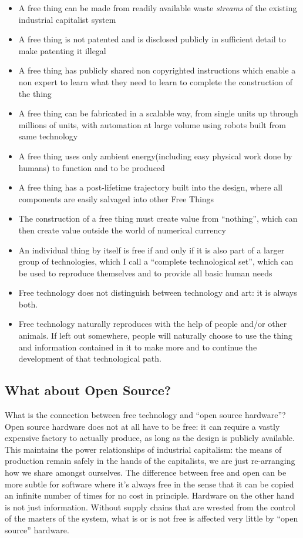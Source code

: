\begin{itemize}
\item
  A free thing can be made from readily available waste \emph{streams}
  of the existing industrial capitalist system
\item
  A free thing is not patented and is disclosed publicly in sufficient
  detail to make patenting it illegal
\item
  A free thing has publicly shared non copyrighted instructions which
  enable a non expert to learn what they need to learn to complete the
  construction of the thing
\item
  A free thing can be fabricated in a scalable way, from single units up
  through millions of units, with automation at large volume using
  robots built from same technology
\item
  A free thing uses only ambient energy(including easy physical work
  done by humans) to function and to be produced
\item
  A free thing has a post-lifetime trajectory built into the design,
  where all components are easily salvaged into other Free Things
\item
  The construction of a free thing must create value from ``nothing'',
  which can then create value outside the world of numerical currency
\item
  An individual thing by itself is free if and only if it is also part
  of a larger group of technologies, which I call a ``complete
  technological set'', which can be used to reproduce themselves and to
  provide all basic human needs
\item
  Free technology does not distinguish between technology and art: it is
  always both.
\item
  Free technology naturally reproduces with the help of people and/or
  other animals. If left out somewhere, people will naturally choose to
  use the thing and information contained in it to make more and to
  continue the development of that technological path.
\end{itemize}

\subsection{What about Open Source?}\label{what-about-open-source}

What is the connection between free technology and ``open source
hardware''? Open source hardware does not at all have to be free: it can
require a vastly expensive factory to actually produce, as long as the
design is publicly available. This maintains the power relationships of
industrial capitalism: the means of production remain safely in the
hands of the capitalists, we are just re-arranging how we share amongst
ourselves. The difference between free and open can be more subtle for
software where it's always free in the sense that it can be copied an
infinite number of times for no cost in principle. Hardware on the other
hand is not just information. Without supply chains that are wrested
from the control of the masters of the system, what is or is not free is
affected very little by ``open source'' hardware.


